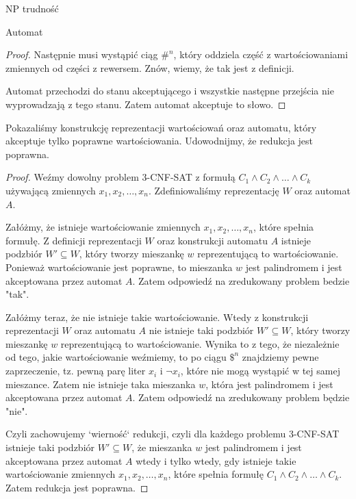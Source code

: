 \documentclass{article}
\theoremstyle{definition}
\theoremstyle{remark}
\begin{document}
\begin{section}{NP trudność}
\begin{subsection}{Automat}
\begin{proof}
         Następnie musi wystąpić ciąg $ \#^n $, który oddziela część z wartościowaniami
         zmiennych od części z rewersem. Znów, wiemy, że tak jest z definicji.

         Automat przechodzi do stanu akceptującego i wszystkie następne przejścia nie
         wyprowadzają z tego stanu. Zatem automat akceptuje to słowo.

     \end{proof}
 \end{subsection}

 Pokazaliśmy konstrukcję reprezentacji wartościowań oraz automatu, który
 akceptuje tylko poprawne wartościowania. Udowodnijmy, że redukcja jest
 poprawna.

 \begin{proof}

     Weźmy dowolny problem 3-CNF-SAT z formułą $C_1 \land C_2 \land \ldots \land
         C_k$ używającą zmiennych $x_1, x_2, \ldots, x_n$. Zdefiniowaliśmy reprezentację
     $W$ oraz automat $A$.

     Załóżmy, że istnieje wartościowanie zmiennych $x_1, x_2, \ldots, x_n$, które
     spełnia formułę. Z definicji reprezentacji $W$ oraz konstrukcji automatu $A$
     istnieje podzbiór $W' \subseteq W$, który tworzy mieszankę $w$ reprezentującą
     to wartościowanie. Ponieważ wartościowanie jest poprawne, to mieszanka $w$ jest
     palindromem i jest akceptowana przez automat $A$. Zatem odpowiedź na
     zredukowany problem bedzie "tak".

     Załóżmy teraz, że nie istnieje takie wartościowanie. Wtedy z konstrukcji
     reprezentacji $W$ oraz automatu $A$ nie istnieje taki podzbiór $W' \subseteq
         W$, który tworzy mieszankę $w$ reprezentującą to wartościowanie. Wynika to z
     tego, że niezależnie od tego, jakie wartościowanie weźmiemy, to po ciągu $ \$^n
     $ znajdziemy pewne zaprzeczenie, tz. pewną parę liter $ x_i $ i $ \neg x_i $,
     które nie mogą wystąpić w tej samej mieszance. Zatem nie istnieje taka
     mieszanka $w$, która jest palindromem i jest akceptowana przez automat $A$.
     Zatem odpowiedź na zredukowany problem będzie "nie".

     Czyli zachowujemy `wierność` redukcji, czyli dla każdego problemu 3-CNF-SAT
     istnieje taki podzbiór $W' \subseteq W$, że mieszanka $w$ jest palindromem i
     jest akceptowana przez automat $A$ wtedy i tylko wtedy, gdy istnieje takie
     wartościowanie zmiennych $x_1, x_2, \ldots, x_n$, które spełnia formułę $C_1
         \land C_2 \land \ldots \land C_k$. Zatem redukcja jest poprawna.

 \end{proof}

\end{section}
\end{document}
